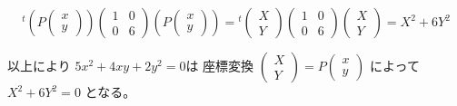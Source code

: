 \documentclass[12pt,b5paper]{ltjsarticle}
\begin{document}
\begin{equation}
   {}^{t}\!\left( P \begin{pmatrix} x \\ y \end{pmatrix} \right)
  \begin{pmatrix}
   1 & 0\\ 0 & 6
  \end{pmatrix}
  \left( P \begin{pmatrix} x \\ y \end{pmatrix} \right)
  =
   {}^{t}\!\begin{pmatrix}X\\Y\end{pmatrix}
   \begin{pmatrix}
    1 & 0\\ 0 & 6
   \end{pmatrix}
   \begin{pmatrix}X\\Y\end{pmatrix}
   = X^2 + 6Y^2
\end{equation}

以上により
$5x^2 + 4xy + 2y^2 =0$は
座標変換
$\begin{pmatrix}X\\Y\end{pmatrix}= P\begin{pmatrix} x \\ y \end{pmatrix}$
によって
$X^2 + 6Y^2 =0$
となる。


\hrulefill
\end{document}
